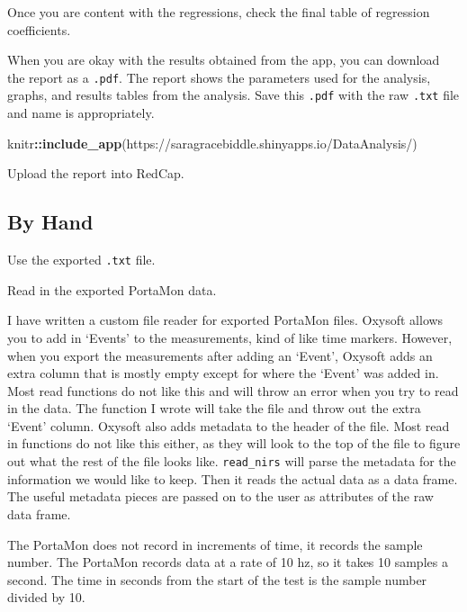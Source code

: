 \documentclass[
]{book}
\newenvironment{Shaded}{\begin{snugshade}}{\end{snugshade}}
\newcommand{\FunctionTok}[1]{\textcolor[rgb]{0.13,0.29,0.53}{\textbf{#1}}}
\newcommand{\NormalTok}[1]{#1}
\newcommand{\SpecialCharTok}[1]{\textcolor[rgb]{0.81,0.36,0.00}{\textbf{#1}}}
\newcommand{\StringTok}[1]{\textcolor[rgb]{0.31,0.60,0.02}{#1}}
\begin{document}
Once you are content with the regressions, check the final table of regression coefficients.

When you are okay with the results obtained from the app, you can download the report as a \texttt{.pdf}. The report shows the parameters used for the analysis, graphs, and results tables from the analysis. Save this \texttt{.pdf} with the raw \texttt{.txt} file and name is appropriately.

\begin{Shaded}
\begin{Highlighting}[]
\NormalTok{knitr}\SpecialCharTok{::}\FunctionTok{include\_app}\NormalTok{(}\StringTok{\textquotesingle{}https://saragracebiddle.shinyapps.io/DataAnalysis/\textquotesingle{}}\NormalTok{)}
\end{Highlighting}
\end{Shaded}

Upload the report into RedCap.

\hypertarget{by-hand}{%
\subsection{By Hand}\label{by-hand}}

Use the exported \texttt{.txt} file.

Read in the exported PortaMon data.

I have written a custom file reader for exported PortaMon files. Oxysoft allows you to add in `Events' to the measurements, kind of like time markers. However, when you export the measurements after adding an `Event', Oxysoft adds an extra column that is mostly empty except for where the `Event' was added in. Most read functions do not like this and will throw an error when you try to read in the data. The function I wrote will take the file and throw out the extra `Event' column. Oxysoft also adds metadata to the header of the file. Most read in functions do not like this either, as they will look to the top of the file to figure out what the rest of the file looks like. \texttt{read\_nirs} will parse the metadata for the information we would like to keep. Then it reads the actual data as a data frame. The useful metadata pieces are passed on to the user as attributes of the raw data frame.

The PortaMon does not record in increments of time, it records the sample number. The PortaMon records data at a rate of 10 hz, so it takes 10 samples a second. The time in seconds from the start of the test is the sample number divided by 10.
\end{document}

